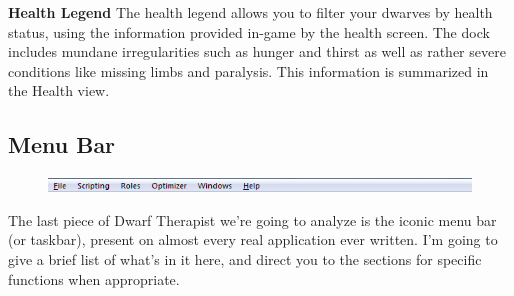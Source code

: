 \documentclass[]{article}
\newcommand{\boldlist}[1] {
\vspace{12pt}
\noindent \textbf{#1}
}
\begin{document}
\begin{figure}[h!]
\begin{subfigure}[C]{0.45\linewidth}
        \end{subfigure}
\end{figure}

\boldlist{Health Legend} The health legend allows you to filter your dwarves by health status, using
the information provided in-game by the health screen. The dock includes mundane irregularities such as
hunger and thirst as well as rather severe conditions like missing limbs and paralysis. This information
is summarized in the Health view.

\newpage
\subsection{Menu Bar}
\label{sec:Menu Bar}
\begin{figure}[h!] \centering \includegraphics[width=\linewidth]{Sec1Fig17}
\end{figure}

The last piece of Dwarf Therapist we're going to analyze is the iconic menu bar (or taskbar), present on
almost every real application ever written. I'm going to give a brief list of what's in it here, and
direct you to the sections for specific functions when appropriate.
\end{document}
